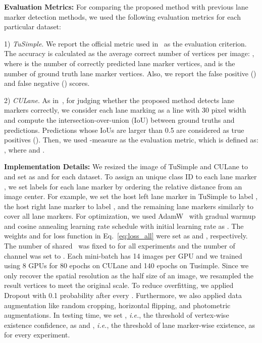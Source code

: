 \documentclass[10pt,twocolumn,letterpaper]{article}
\begin{document}
\textbf{Evaluation Metrics:} For comparing the proposed method with previous lane marker detection methods, we used the following evaluation metrics for each particular dataset:

1) \textit{TuSimple}. We report the official metric used in~\cite{tusimple} as the evaluation criterion. The accuracy is calculated as the average correct number of vertices per image: , where  is the number of correctly predicted lane marker vertices, and  is the number of ground truth lane marker vertices. Also, we report the false positive () and false negative () scores.

2) \textit{CULane}. As in~\cite{SpatialAsDeep}, for judging whether the proposed method detects lane markers correctly, we consider each lane marking as a line with 30 pixel width and compute the intersection-over-union (IoU) between ground truths and predictions. Predictions whose IoUs are larger than 0.5 are considered as true positives (). Then, we used -measure as the evaluation metric, which is defined as: , where  and .

\vspace{3.px}
\textbf{Implementation Details:} We resized the image of TuSimple and CULane to  and set  as  and  for each dataset. To assign an unique class ID to each lane marker , we set labels for each lane marker by ordering the relative distance from an image center. For example, we set the host left lane marker in TuSimple to label , the host right lane marker to label , and the remaining lane markers similarly to cover all  lane markers. For optimization, we used AdamW~\cite{Adamw} with gradual warmup and cosine annealing learning rate schedule with initial learning rate as . The weights  and  for loss function in Eq.~\ref{eq:loss_all} were set as  and , respectively. The number of shared \reductionname\ was fixed to  for all experiments and the number of channel  was set to . Each mini-batch has 14 images per GPU and we trained using 8 GPUs for 80 epochs on CULane and 140 epochs on Tusimple. Since we only recover the spatial resolution as the half size of an image, we resampled the result vertices to meet the original scale. To reduce overfitting, we applied Dropout with 0.1 probability after every \reductionname. Furthermore, we also applied data augmentation like random cropping, horizontal flipping, and photometric augmentations. In testing time, we set , \textit{i.e.}, the threshold of vertex-wise existence confidence, as  and , \textit{i.e.}, the threshold of lane marker-wise existence, as  for every experiment.
\end{document}
